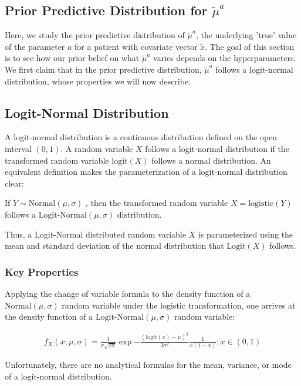 \subsection{Prior Predictive Distribution for $\tilde{\mu}^a$}
Here, we study the prior predictive distribution of $\tilde{\mu}^a$, the underlying 'true' value of the parameter $a$ for a patient with covariate vector $\tilde{x}$.  The goal of this section is to see how our prior belief on what $\tilde{\mu}^a$ varies depends on the hyperparameters.  We first claim that in the prior predictive distribution, $\tilde{\mu}^a$ follows a logit-normal distribution, whose properties we will now describe.

\subsection{Logit-Normal Distribution}
A logit-normal distribution is a continuous distribution defined on the open interval $(0,1)$.  A random variable $X$ follows a logit-normal distribution if the transformed random variable $\textrm{logit}(X)$ follows a normal distribution.  An equivalent definition makes the parameterization of a logit-normal distribution clear:
\begin{defn}
If $Y \sim \textrm{Normal}(\mu, \sigma)$ , then the transformed random variable $X=\textrm{logistic}(Y)$ follows a $\textrm{Logit-Normal}(\mu, \sigma)$ distribution. 
\end{defn}

Thus, a Logit-Normal distributed random variable $X$ is parameterized using the mean and standard deviation of the normal distribution that $\textrm{Logit}(X)$ follows.

\subsubsection{Key Properties}

Applying the change of variable formula to the density function of a $\textrm{Normal}(\mu, \sigma)$ random variable under the logistic transformation, one arrives at the density function of a $\textrm{Logit-Normal}(\mu, \sigma)$ random variable:

\begin{eqnarray}
f_X(x;\mu, \sigma) = \frac{1}{\sigma \sqrt{2\pi}} \exp{-\frac{(\textrm{logit}(x) - \mu)^2}{2 \sigma^2}}\frac{1}{x(1-x)};   x \in (0,1)
\end{eqnarray}

Unfortunately, there are no analytical formulas for the mean, variance, or mode of a logit-normal distribution.  

